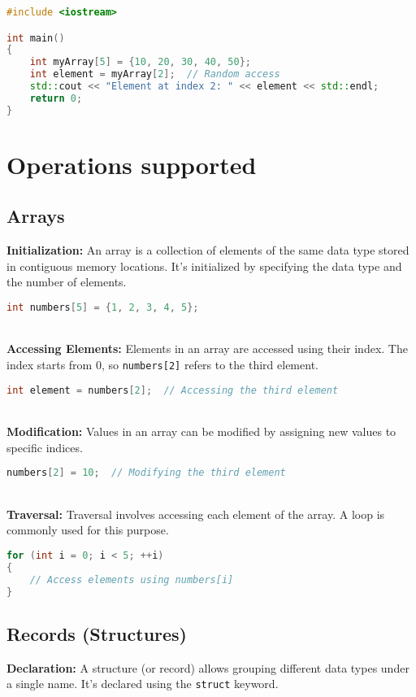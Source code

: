 \documentclass[12pt, a4paper]{report}
\begin{document}
\begin{lstlisting}[language=C++]
#include <iostream>

int main() 
{
    int myArray[5] = {10, 20, 30, 40, 50};
    int element = myArray[2];  // Random access
    std::cout << "Element at index 2: " << element << std::endl;
    return 0;
}
\end{lstlisting}

\section*{Operations supported}

\subsection*{Arrays}

\textbf{Initialization: }An array is a collection of elements of the same data type stored in contiguous memory locations. It's initialized by specifying the data type and the number of elements.
\begin{lstlisting}[language=C++]
int numbers[5] = {1, 2, 3, 4, 5};
\end{lstlisting}
\textbf{\\Accessing Elements:}
Elements in an array are accessed using their index. The index starts from 0, so \texttt{numbers[2]} refers to the third element.
\begin{lstlisting}[language=C++]
int element = numbers[2];  // Accessing the third element
\end{lstlisting}
\textbf{\\Modification:}
Values in an array can be modified by assigning new values to specific indices.
\begin{lstlisting}[language=C++]
numbers[2] = 10;  // Modifying the third element
\end{lstlisting}
\textbf{\\Traversal: }Traversal involves accessing each element of the array. A loop is commonly used for this purpose.
\begin{lstlisting}[language=C++]
for (int i = 0; i < 5; ++i) 
{
    // Access elements using numbers[i]
}
\end{lstlisting}

\subsection*{Records (Structures)}

\textbf{Declaration: }A structure (or record) allows grouping different data types under a single name. It's declared using the \texttt{struct} keyword.
\end{document}
